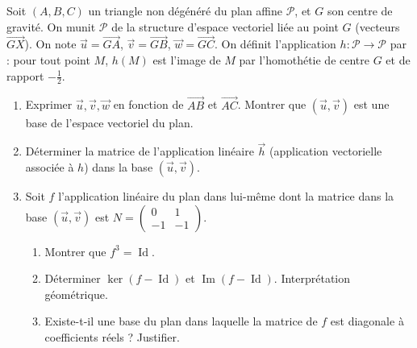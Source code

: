 \documentclass[11pt]{article}
\begin{document}
\begin{exercice}
Soit $(A, B, C)$ un triangle non dégénéré du plan affine $\mathcal{P}$, et $G$ son centre de gravité.
On munit $\mathcal{P}$ de la structure d'espace vectoriel liée au point $G$ (vecteurs $\overrightarrow{GX}$).
On note $\vec{u} = \overrightarrow{GA}$, $\vec{v} = \overrightarrow{GB}$, $\vec{w} = \overrightarrow{GC}$.
On définit l'application $h : \mathcal{P} \to \mathcal{P}$ par : pour tout point $M$, $h(M)$ est l'image de $M$ par l'homothétie de centre $G$ et de rapport $-\frac{1}{2}$.

\begin{enumerate}
    \item Exprimer $\vec{u}, \vec{v}, \vec{w}$ en fonction de $\overrightarrow{AB}$ et $\overrightarrow{AC}$. Montrer que $(\vec{u}, \vec{v})$ est une base de l'espace vectoriel du plan.
    \item Déterminer la matrice de l'application linéaire $\overrightarrow{h}$ (application vectorielle associée à $h$) dans la base $(\vec{u}, \vec{v})$.
    \item Soit $f$ l'application linéaire du plan dans lui-même dont la matrice dans la base $(\vec{u}, \vec{v})$ est $N = \begin{pmatrix} 0 & 1 \\ -1 & -1 \end{pmatrix}$.
    \begin{enumerate}
        \item Montrer que $f^3 = \operatorname{Id}$.
        \item Déterminer $\ker(f - \operatorname{Id})$ et $\operatorname{Im}(f - \operatorname{Id})$. Interprétation géométrique.
        \item Existe-t-il une base du plan dans laquelle la matrice de $f$ est diagonale à coefficients réels ? Justifier.
    \end{enumerate}
\end{enumerate}
\end{exercice}
\end{document}
